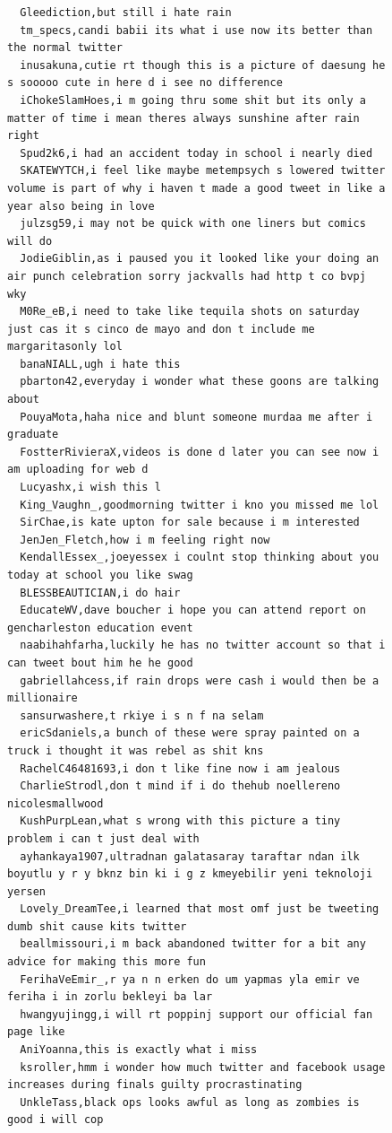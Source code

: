 \begin{figure}[htpb]
\begin{verbatim}
  Gleediction,but still i hate rain
  tm_specs,candi babii its what i use now its better than the normal twitter
  inusakuna,cutie rt though this is a picture of daesung he s sooooo cute in here d i see no difference
  iChokeSlamHoes,i m going thru some shit but its only a matter of time i mean theres always sunshine after rain right
  Spud2k6,i had an accident today in school i nearly died
  SKATEWYTCH,i feel like maybe metempsych s lowered twitter volume is part of why i haven t made a good tweet in like a year also being in love
  julzsg59,i may not be quick with one liners but comics will do
  JodieGiblin,as i paused you it looked like your doing an air punch celebration sorry jackvalls had http t co bvpj wky
  M0Re_eB,i need to take like tequila shots on saturday just cas it s cinco de mayo and don t include me margaritasonly lol
  banaNIALL,ugh i hate this
  pbarton42,everyday i wonder what these goons are talking about
  PouyaMota,haha nice and blunt someone murdaa me after i graduate
  FostterRivieraX,videos is done d later you can see now i am uploading for web d
  Lucyashx,i wish this l
  King_Vaughn_,goodmorning twitter i kno you missed me lol
  SirChae,is kate upton for sale because i m interested
  JenJen_Fletch,how i m feeling right now
  KendallEssex_,joeyessex i coulnt stop thinking about you today at school you like swag
  BLESSBEAUTICIAN,i do hair
  EducateWV,dave boucher i hope you can attend report on gencharleston education event
  naabihahfarha,luckily he has no twitter account so that i can tweet bout him he he good
  gabriellahcess,if rain drops were cash i would then be a millionaire
  sansurwashere,t rkiye i s n f na selam
  ericSdaniels,a bunch of these were spray painted on a truck i thought it was rebel as shit kns
  RachelC46481693,i don t like fine now i am jealous
  CharlieStrodl,don t mind if i do thehub noellereno nicolesmallwood
  KushPurpLean,what s wrong with this picture a tiny problem i can t just deal with
  ayhankaya1907,ultradnan galatasaray taraftar ndan ilk boyutlu y r y bknz bin ki i g z kmeyebilir yeni teknoloji yersen
  Lovely_DreamTee,i learned that most omf just be tweeting dumb shit cause kits twitter
  beallmissouri,i m back abandoned twitter for a bit any advice for making this more fun
  FerihaVeEmir_,r ya n n erken do um yapmas yla emir ve feriha i in zorlu bekleyi ba lar
  hwangyujingg,i will rt poppinj support our official fan page like
  AniYoanna,this is exactly what i miss
  ksroller,hmm i wonder how much twitter and facebook usage increases during finals guilty procrastinating
  UnkleTass,black ops looks awful as long as zombies is good i will cop

\end{verbatim}
\end{figure}
